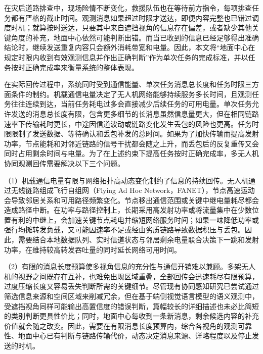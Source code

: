 在灾后道路排查中，现场险情不断变化，救援队伍也在等待前方指令，每项排查任务都有严格的截止时间。观测消息如果超过时限才送达，即便内容完整也已错过调度时机；就算按时送达，只要其中来自遮挡视角的信息存在偏差，或者缺少其他关键角度的补充，地面中心依然可能判断出错。而当已收到的信息已经足够得出准确结论时，继续发送重复内容只会额外消耗带宽和电量。因此，本文将“地面中心在规定时限内收到有效观测信息并作出正确判断”作为单次任务的完成标准，并以任务按时正确完成率来衡量系统的整体表现。

\begin{figure}[H]
\centering

\label{fig:intro:task-flow}
\end{figure}

在实际回传过程中，系统同时受到通信能量、单次任务消息总长度和任务时限三方面条件的制约。机载通信电量决定了无人机网络能够持续服务多长时间，且观测任务往往连续到达，当前任务耗电过多会直接减少后续任务的可用电量。单次任务允许发送的消息总长度有限，包含更多细节的长消息虽然信息量更大，但在相同链路速率下传输耗时更长，中途因信道波动或链路变化发生丢包的风险也更高。任务时限限制了发送数据、等待确认和丢包补发的总时间。如果为了加快传输而提高发射功率，节点能耗和对邻近链路的信号干扰都会随之上升，而丢包后的反复重传又会同时占用剩余时间与电量。为了在上述约束下提高任务按时正确完成率，多无人机协同观测回传需要解决以下三个问题。

（1）机载通信电量有限与网络拓扑高动态变化制约了信息的持续回传。无人机通过无线链路组成飞行自组网（Flying Ad Hoc Network，FANET），节点高速运动会导致邻居关系和可用路径频繁变化\cite{bekmezci2013fanet,intro4}。节点移出通信范围或关键中继电量耗尽都会造成路径中断。在功率与路径控制上，长期采用高发射功率或将流量集中在少数位置有利的中继上，会加速关键节点耗电并缩短网络服务时间；如果一味降低功率或强行均摊转发负载，又可能因速率不足或经由劣质链路导致数据积压与丢包\cite{mozaffari2019tutorial,chen2022uav}。因此，需要结合本地数据队列、实时信道状态与邻居剩余电量联合决策下一跳和发射功率，在维持较高转发吞吐量的同时延长网络可用时间。

（2）有限的消息长度预算使多视角信息的充分性与通信开销难以兼顾。多架无人机的视野之间既存在互补，也难免出现区域重叠，全部回传会迅速耗尽有限预算，过度压缩长度又容易丢失判断所需的关键细节。尽管现有协同感知研究已尝试通过筛选信息来源和空间区域来削减冗余\cite{who2com,where2comm,how2comm}，但在基于端侧视觉语言模型的语义观测中，受遮挡视角同样可能输出高置信度的错误判断，篇幅较长的详细描述也未必比简短的类别判断更具性价比；同时，地面中心每收到一条新消息，剩余候选内容的补充价值就会随之改变。因此，需要在有限消息长度预算内，综合各视角的观测可靠性、地面中心已有判断与链路传输代价，动态决定消息来源、详略程度以及停止发送的时机。

